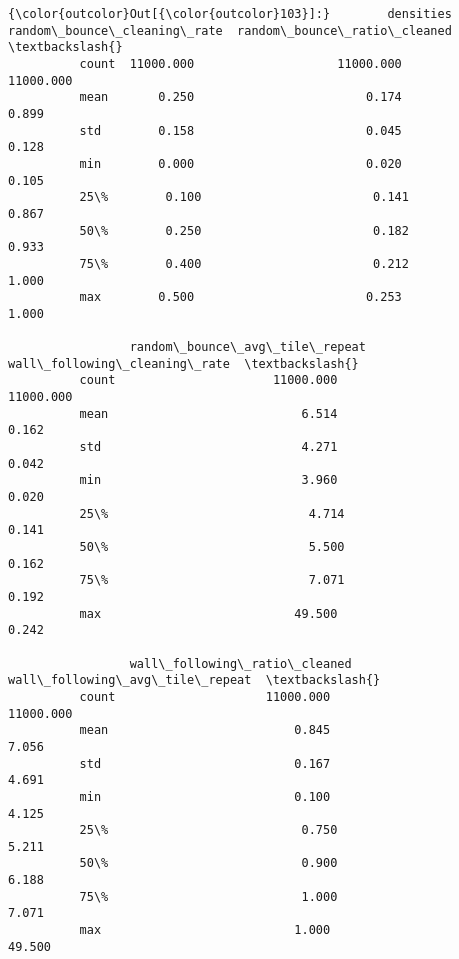 \documentclass[11pt]{article}
\begin{document}
\begin{Verbatim}[commandchars=\\\{\}]
{\color{outcolor}Out[{\color{outcolor}103}]:}        densities  random\_bounce\_cleaning\_rate  random\_bounce\_ratio\_cleaned  \textbackslash{}
          count  11000.000                    11000.000                    11000.000   
          mean       0.250                        0.174                        0.899   
          std        0.158                        0.045                        0.128   
          min        0.000                        0.020                        0.105   
          25\%        0.100                        0.141                        0.867   
          50\%        0.250                        0.182                        0.933   
          75\%        0.400                        0.212                        1.000   
          max        0.500                        0.253                        1.000   
          
                 random\_bounce\_avg\_tile\_repeat  wall\_following\_cleaning\_rate  \textbackslash{}
          count                      11000.000                     11000.000   
          mean                           6.514                         0.162   
          std                            4.271                         0.042   
          min                            3.960                         0.020   
          25\%                            4.714                         0.141   
          50\%                            5.500                         0.162   
          75\%                            7.071                         0.192   
          max                           49.500                         0.242   
          
                 wall\_following\_ratio\_cleaned  wall\_following\_avg\_tile\_repeat  \textbackslash{}
          count                     11000.000                       11000.000   
          mean                          0.845                           7.056   
          std                           0.167                           4.691   
          min                           0.100                           4.125   
          25\%                           0.750                           5.211   
          50\%                           0.900                           6.188   
          75\%                           1.000                           7.071   
          max                           1.000                          49.500   
          

\end{Verbatim}
\end{document}
